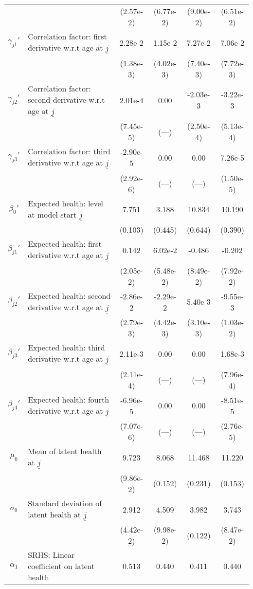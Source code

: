\begin{table}[H]
\begin{center}
{\begin{tabular}{clcccc}
 & & (2.57e-2) & (6.77e-2) & (9.00e-2) & (6.51e-2) \\
$\gamma_{j1}'$ & Correlation factor: first derivative w.r.t age at $\underline{j}$ & 2.28e-2 & 1.15e-2 & 7.27e-2 & 7.06e-2 \\
 & & (1.38e-3) & (4.02e-3) & (7.40e-3) & (7.72e-3) \\
$\gamma_{j2}'$ & Correlation factor: second derivative w.r.t age at $\underline{j}$ & 2.01e-4 & 0.00 & -2.03e-3 & -3.22e-3 \\
 & & (7.45e-5) & (---) & (2.50e-4) & (5.13e-4) \\
$\gamma_{j3}'$ & Correlation factor: third derivative w.r.t age at $\underline{j}$ & -2.90e-5 & 0.00 & 0.00 & 7.26e-5 \\
 & & (2.92e-6) & (---) & (---) & (1.50e-5) \\
$\beta_{0}'$ & Expected health: level at model start $\underline{j}$ & 7.751 & 3.188 & 10.834 & 10.190 \\
 & & (0.103) & (0.445) & (0.644) & (0.390) \\
$\beta_{j1}'$ & Expected health: first derivative w.r.t age at $\underline{j}$ & 0.142 & 6.02e-2 & -0.486 & -0.202 \\
 & & (2.05e-2) & (5.48e-2) & (8.49e-2) & (7.92e-2) \\
$\beta_{j2}'$ & Expected health: second derivative w.r.t age at $\underline{j}$ & -2.86e-2 & -2.29e-2 & 5.40e-3 & -9.55e-3 \\
 & & (2.79e-3) & (4.42e-3) & (3.10e-3) & (1.03e-2) \\
$\beta_{j3}'$ & Expected health: third derivative w.r.t age at $\underline{j}$ & 2.11e-3 & 0.00 & 0.00 & 1.68e-3 \\
 & & (2.11e-4) & (---) & (---) & (7.96e-4) \\
$\beta_{j4}'$ & Expected health: fourth derivative w.r.t age at $\underline{j}$ & -6.96e-5 & 0.00 & 0.00 & -8.51e-5 \\
 & & (7.07e-6) & (---) & (---) & (2.76e-5) \\
$\mu_0$ & Mean of latent health at $\underline{j}$ & 9.723 & 8.068 & 11.468 & 11.220 \\
 & & (9.86e-2) & (0.152) & (0.231) & (0.153) \\
$\sigma_{0}$ & Standard deviation of latent health at $\underline{j}$ & 2.912 & 4.509 & 3.982 & 3.743 \\
 & & (4.42e-2) & (9.98e-2) & (0.122) & (8.47e-2) \\
$\alpha_1$ & SRHS: Linear coefficient on latent health & 0.513 & 0.440 & 0.411 & 0.440 \\

\end{tabular}}
\end{center}
\end{table}
